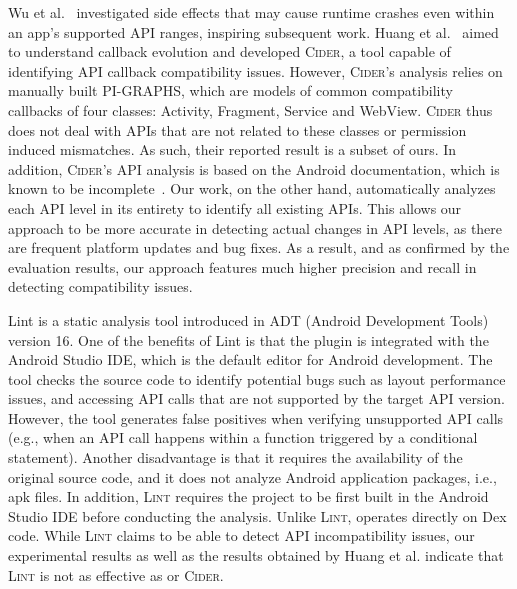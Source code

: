 Wu et al.~\cite{wu2017measuring} investigated side effects
that may cause runtime crashes even within an app's
supported API ranges, inspiring subsequent work.
%
Huang et al.~\cite{huang2018understanding}
aimed to understand callback evolution and developed
\textsc{Cider}, a tool capable of identifying API callback
compatibility issues. However, \textsc{Cider}'s analysis
relies on manually built PI-GRAPHS, which are models of
common compatibility callbacks of four classes: Activity,
Fragment, Service and WebView. \textsc{Cider} thus does not deal
with APIs that are not related to these classes or
permission induced mismatches. 
As such, their reported result
is a subset of ours. In addition, \textsc{Cider}'s API
analysis is based on the Android documentation, which is
known to be incomplete~\cite{wu2017measuring}. Our work, on
the other hand, automatically analyzes each API level in its
entirety to identify all existing APIs. This allows our
approach to be more accurate in detecting actual changes in
API levels, as there are frequent platform updates and bug
fixes. As a result, and as confirmed by the evaluation results, 
our approach features much higher precision and recall  in detecting compatibility issues.

Lint \cite{linttips} is a static analysis tool introduced in
ADT (Android Development Tools) version 16. One of the
benefits of Lint is that the plugin is integrated with the
Android Studio IDE, which is the default editor for Android
development. The tool checks the source code to identify
potential bugs such as layout performance issues, and
accessing API calls that are not supported by the target API
version. However, the tool generates false positives when
verifying unsupported API calls (e.g., when an API call
happens within a function triggered by a conditional
statement). Another disadvantage is that it requires the
availability of the original source code, and it does not
analyze Android application packages, i.e., apk files.  In
addition, \textsc{Lint} requires the project to be first
built in the Android Studio IDE before conducting the
analysis.  Unlike \textsc{Lint}, \@approach operates
directly on Dex code. While \textsc{Lint} claims to be able
to detect API incompatibility issues, our experimental
results as well as the results obtained by Huang et al.
indicate that \textsc{Lint} is not as effective as
\@approach or \textsc{Cider}.

